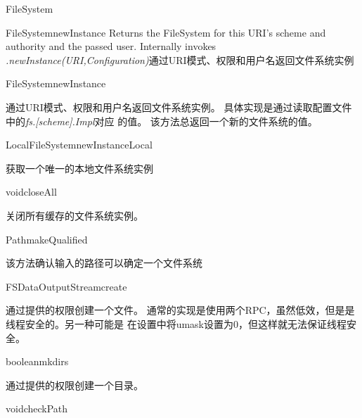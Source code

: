 \begin{XeClass}{FileSystem}
\begin{XeMethod}{\XePublic}{FileSystem}{newInstance}
 Returns the FileSystem for this URI's scheme and authority and the
 passed user. Internally invokes \emph{.newInstance(URI,Configuration)}通过URI模式、权限和用户名返回文件系统实例

    \end{XeMethod}

    \begin{XeMethod}{\XePublic}{FileSystem}{newInstance}
         
 通过URI模式、权限和用户名返回文件系统实例。
 具体实现是通过读取配置文件中的\emph{fs.[scheme].Impl}对应
 的值。
 该方法总返回一个新的文件系统的值。

    \end{XeMethod}

    \begin{XeMethod}{\XePublic}{LocalFileSystem}{newInstanceLocal}
         
 获取一个唯一的本地文件系统实例

    \end{XeMethod}

    \begin{XeMethod}{\XePublic}{void}{closeAll}
         
 关闭所有缓存的文件系统实例。

    \end{XeMethod}

    \begin{XeMethod}{\XePublic}{Path}{makeQualified}
         
 该方法确认输入的路径可以确定一个文件系统

    \end{XeMethod}

    \begin{XeMethod}{\XePublic}{FSDataOutputStream}{create}
         
 通过提供的权限创建一个文件。
 通常的实现是使用两个RPC，虽然低效，但是是线程安全的。另一种可能是
 在设置中将umask设置为0，但这样就无法保证线程安全。

    \end{XeMethod}

    \begin{XeMethod}{\XePublic}{boolean}{mkdirs}
         
 通过提供的权限创建一个目录。

    \end{XeMethod}

    \begin{XeMethod}{\XeProtected}{void}{checkPath}
         

\end{XeMethod}
\end{XeClass}
